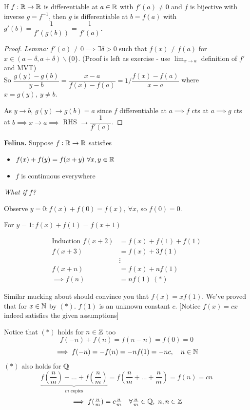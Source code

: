 \documentclass[twoside]{scrartcl}
\begin{document}
\begin{theorem}
	If $f:\mathbb{R} \to \mathbb{R}$ is differentiable at $a\in \mathbb{R}$ with $f'(a) \neq 0$ and $f$ is bijective with inverse $g = f^{-1}$, then $g$ is differentiable at $b = f(a)$ with $g'(b) = \dfrac{1}{f'(g(b))} = \dfrac{1}{f'(a)}.$
\end{theorem}
\begin{proof}
\textit{Lemma:} $f'(a) \neq 0 \implies \exists \delta > 0$ such that $f(x) \neq f(a)$ for $x \in (a-\delta,a + \delta)\backslash\{0\}$.  (Proof is left as exercise - use $\lim_{x\to a}$ definition of $f'$ and MVT) \\

 So $\dfrac{g(y)-g(b)}{y-b} = \dfrac{x-a}{f(x) - f(a)} = 1/\dfrac{f(x)-f(a)}{x-a}$ where $x = g(y),~y \neq b$.
 
 As $y \to b$, $g(y) \to g(b) = a$ since $f$ differentiable at $a \implies f$ cts at $a \implies g$ cts at $b \implies x \to a \implies$ RHS $\to \dfrac{1}{f'(a)}$.	
\end{proof}\vspace*{15pt}



\textbf{Felina.} Suppose $f: \mathbb{R} \to \mathbb{R}$ satisfies
\begin{itemize}
\item $f(x) + f(y) = f(x+y)~\forall x,y\in\mathbb{R}$
\item $f$ is continuous everywhere	
\end{itemize}

\emph{What if $f$?}

Observe $y = 0: f(x) + f(0) = f(x),~\forall x$, so $f(0) = 0$. 

For $y = 1: f(x) + f(1) = f(x+1)$

\[\begin{aligned}\text{Induction } f(x+2) &= f(x) + f(1) + f(1) \\
f(x+3) &= f(x) + 3f(1)\\
&\vdots \\ 
 f(x+n) &= f(x) + nf(1)\\
\implies f(n) &= nf(1) ~(*)\end{aligned}
\]

Similar mucking about should convince you that $f(x) = xf(1)$. We've proved that for $x\in\mathbb{N}$ by $(*)$. $f(1)$ is an unknown constant $c$. [Notice $f(x) = cx$ indeed satisfies the given assumptions]

Notice  that $(*)$ holds for $n \in\mathbb{Z}$ too
\[f(-n) + f(n) = f(n-n) = f(0) = 0\]
\[\implies f(-n) = -f(n) = -nf(1) = -nc,\quad n \in\mathbb{N}\]
$(*)$ also holds for $\mathbb{Q}$
\[\textstyle{\underbrace{\textstyle{f(\frac{n}{m}) + \dots + f(\frac{n}{m})}}_{m \text{ copies}} = f(\frac{n}{m} + \dots + \frac{n}{m}) =f(n) = cn}\]
\[\textstyle{\implies f(\frac{n}{m}) = c\frac{n}{m} \quad \forall \frac{n}{m} \in\mathbb{Q},~n,n\in\mathbb{Z}}\]
\end{document}
